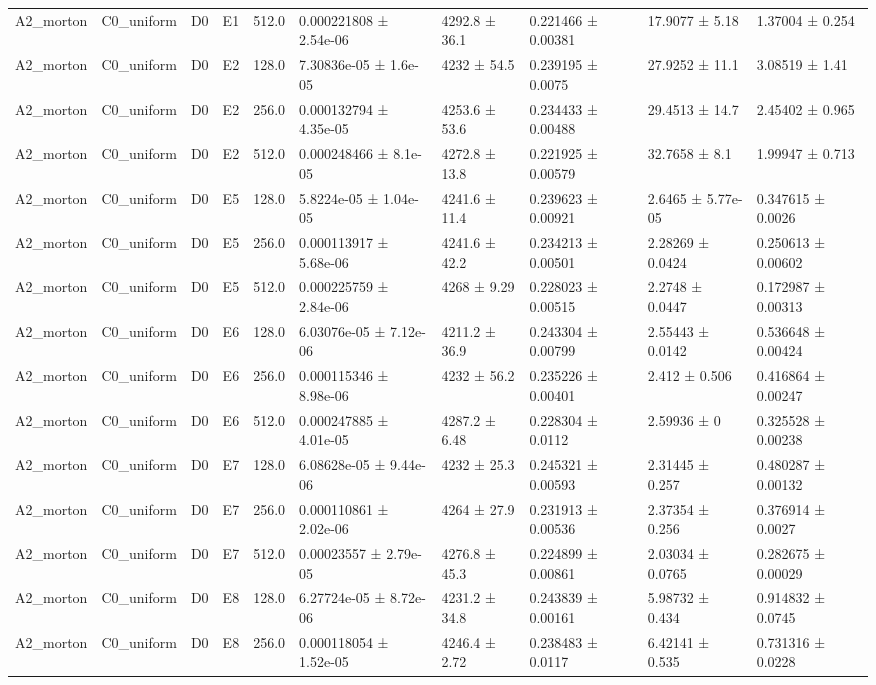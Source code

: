\begin{table}
\begin{tabular}{llllllllll}
A2\_morton & C0\_uniform & D0 & E1 & 512.0 & 0.000221808 ± 2.54e-06 & 4292.8 ± 36.1 & 0.221466 ± 0.00381 & 17.9077 ± 5.18 & 1.37004 ± 0.254 \\
A2\_morton & C0\_uniform & D0 & E2 & 128.0 & 7.30836e-05 ± 1.6e-05 & 4232 ± 54.5 & 0.239195 ± 0.0075 & 27.9252 ± 11.1 & 3.08519 ± 1.41 \\
A2\_morton & C0\_uniform & D0 & E2 & 256.0 & 0.000132794 ± 4.35e-05 & 4253.6 ± 53.6 & 0.234433 ± 0.00488 & 29.4513 ± 14.7 & 2.45402 ± 0.965 \\
A2\_morton & C0\_uniform & D0 & E2 & 512.0 & 0.000248466 ± 8.1e-05 & 4272.8 ± 13.8 & 0.221925 ± 0.00579 & 32.7658 ± 8.1 & 1.99947 ± 0.713 \\
A2\_morton & C0\_uniform & D0 & E5 & 128.0 & 5.8224e-05 ± 1.04e-05 & 4241.6 ± 11.4 & 0.239623 ± 0.00921 & 2.6465 ± 5.77e-05 & 0.347615 ± 0.0026 \\
A2\_morton & C0\_uniform & D0 & E5 & 256.0 & 0.000113917 ± 5.68e-06 & 4241.6 ± 42.2 & 0.234213 ± 0.00501 & 2.28269 ± 0.0424 & 0.250613 ± 0.00602 \\
A2\_morton & C0\_uniform & D0 & E5 & 512.0 & 0.000225759 ± 2.84e-06 & 4268 ± 9.29 & 0.228023 ± 0.00515 & 2.2748 ± 0.0447 & 0.172987 ± 0.00313 \\
A2\_morton & C0\_uniform & D0 & E6 & 128.0 & 6.03076e-05 ± 7.12e-06 & 4211.2 ± 36.9 & 0.243304 ± 0.00799 & 2.55443 ± 0.0142 & 0.536648 ± 0.00424 \\
A2\_morton & C0\_uniform & D0 & E6 & 256.0 & 0.000115346 ± 8.98e-06 & 4232 ± 56.2 & 0.235226 ± 0.00401 & 2.412 ± 0.506 & 0.416864 ± 0.00247 \\
A2\_morton & C0\_uniform & D0 & E6 & 512.0 & 0.000247885 ± 4.01e-05 & 4287.2 ± 6.48 & 0.228304 ± 0.0112 & 2.59936 ± 0 & 0.325528 ± 0.00238 \\
A2\_morton & C0\_uniform & D0 & E7 & 128.0 & 6.08628e-05 ± 9.44e-06 & 4232 ± 25.3 & 0.245321 ± 0.00593 & 2.31445 ± 0.257 & 0.480287 ± 0.00132 \\
A2\_morton & C0\_uniform & D0 & E7 & 256.0 & 0.000110861 ± 2.02e-06 & 4264 ± 27.9 & 0.231913 ± 0.00536 & 2.37354 ± 0.256 & 0.376914 ± 0.0027 \\
A2\_morton & C0\_uniform & D0 & E7 & 512.0 & 0.00023557 ± 2.79e-05 & 4276.8 ± 45.3 & 0.224899 ± 0.00861 & 2.03034 ± 0.0765 & 0.282675 ± 0.00029 \\
A2\_morton & C0\_uniform & D0 & E8 & 128.0 & 6.27724e-05 ± 8.72e-06 & 4231.2 ± 34.8 & 0.243839 ± 0.00161 & 5.98732 ± 0.434 & 0.914832 ± 0.0745 \\
A2\_morton & C0\_uniform & D0 & E8 & 256.0 & 0.000118054 ± 1.52e-05 & 4246.4 ± 2.72 & 0.238483 ± 0.0117 & 6.42141 ± 0.535 & 0.731316 ± 0.0228 \\

\end{tabular}
\end{table}
